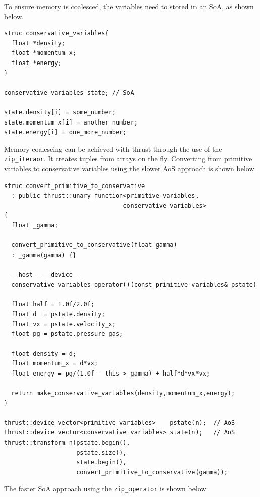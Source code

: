 To ensure memory is coalesced, the variables need to stored in an SoA, as shown below.
\begin{lstlisting}
struc conservative_variables{
  float *density;
  float *momentum_x;
  float *energy;
}

conservative_variables state; // SoA

state.density[i] = some_number;
state.momentum_x[i] = another_number;
state.energy[i] = one_more_number;
\end{lstlisting} 
Memory coalescing can be achieved with thrust through the use of the \verb+zip_iteraor+.  It creates tuples from arrays on the fly.  Converting from primitive variables to conservative variables using the slower AoS approach is shown below.
\begin{lstlisting}
struc convert_primitive_to_conservative 
  : public thrust::unary_function<primitive_variables,
                                 conservative_variables>
{
  float _gamma;
  
  convert_primitive_to_conservative(float gamma)
  : _gamma(gamma) {}

  __host__ __device__
  conservative_variables operator()(const primitive_variables& pstate)

  float half = 1.0f/2.0f;
  float d  = pstate.density;
  float vx = pstate.velocity_x;
  float pg = pstate.pressure_gas;

  float density = d;
  float momentum_x = d*vx;
  float energy = pg/(1.0f - this->_gamma) + half*d*vx*vx;
  
  return make_conservative_variables(density,momentum_x,energy);
}

thrust::device_vector<primitive_variables>    pstate(n);  // AoS
thrust::device_vector<conservative_variables> state(n);   // AoS
thrust::transform_n(pstate.begin(),
                    pstate.size(),
                    state.begin(),
                    convert_primitive_to_conservative(gamma));
\end{lstlisting} 
The faster SoA approach using the \verb+zip_operator+ is shown below.
